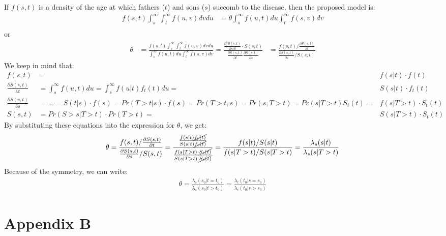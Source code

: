 \documentclass[]{article}
\begin{document}
If $f(s,t)$ is a density of the age at which fathers ($t$) and sons ($s$) succomb to the disease, then the proposed model is:
	$$
	\begin{aligned}
		f(s,t)\int_s^{\infty}\int_t^{\infty} f(u, v)dvdu &= \theta \int_s^{\infty}f(u, t)du\int_t^{\infty}f(s, v)dv \\
	\end{aligned}
	$$
		or\\
	$$
	\begin{aligned}
		\theta &= \frac{f(s,t)\int_s^{\infty}\int_t^{\infty} f(u, v)dvdu} {\int_s^{\infty}f(u, t)du\int_t^{\infty}f(s, v)dv} = 
		\frac{ \frac{\partial^2 S(s, t)}{\partial s\partial t} \cdot S(s, t)}    {\frac{\partial S(s, t)}{\partial t} \frac{\partial S(s, t)}{\partial s}}
		&= \frac{f(s,t)/\frac{\partial S(s, t)}{\partial t}}  {\frac{\partial S(s, t)}{\partial s}/ S(s, t) } 
	\end{aligned}
	$$
We keep in mind that:
	$$
	\begin{aligned}
		f(s,t) &= &f(s|t)\cdot f(t)\\
		\frac{\partial S(s,t)}{\partial t} &= \int_s^{\infty}f(u, t)du = \int_s^{\infty}f(u|t)f_t(t)du = &S(s|t)\cdot f_t(t)\\
		\frac{\partial S(s,t)}{\partial s} &=...= S(t|s)\cdot f(s) = Pr(T>t|s)\cdot f(s) = Pr(T>t, s) = Pr(s,T>t) = Pr(s|T>t)S_t(t) = &f(s|T>t)\cdot S_t(t)\\
		S(s,t) &= Pr(S>s|T>t)\cdot Pr(T>t) = &S(s|T>t)\cdot S_t(t)
	\end{aligned}
	$$
By substituting these equations into the expression for $\theta$, we get:
	$$
	\begin{aligned}
		\theta &= \frac{f(s,t)/\frac{\partial S(s, t)}{\partial t}}  {\frac{\partial S(s, t)}{\partial s}/ S(s, t) } = \frac{  \frac{f(s|t)\cancel{f_t(t)}}{S(s|t)\cancel{f_t(t)}} } { \frac{f(s|T>t)\cdot \cancel{S_t(t)}}{S(s|T>t)\cdot \cancel{S_t(t)}}  }
		  = \frac{f(s|t)/S(s|t)}     {f(s|T>t) / S(s|T>t) }
		= \frac{\lambda_s(s|t) } {\lambda_s(s|T>t) }\\
	\end{aligned}
	$$
Because of the symmetry, we can write:
	$$
	\begin{aligned}
	  \theta = \frac{ \lambda_s(s_0|t=t_0)}{\lambda_s(s_0|t>t_0)} = \frac{ \lambda_t(t_0|s=s_0)}{\lambda_t(t_0|s>s_0)}
	\end{aligned}
	$$


\section{Appendix B} \label{appendixB}

\end{document}
